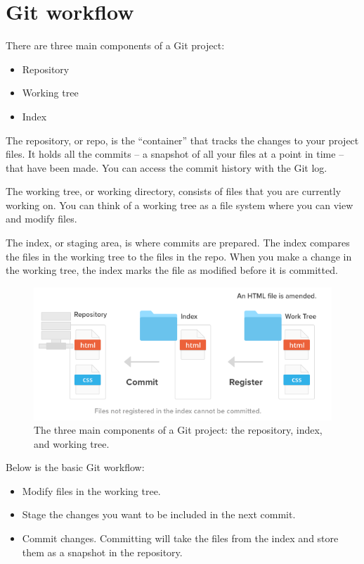 \documentclass[10pt,a4paper,english]{report}
\begin{document}
\chapter{Git workflow}
    \label{chap:workflow}

    There are three main components of a Git project:
    \begin{itemize}
        \item Repository
        \item Working tree
        \item Index
    \end{itemize}

    The repository, or repo, is the “container” that tracks the changes to your project files. It holds all the commits -- a snapshot of all your files at a point in time -- that have been made. You can access the commit history with the Git log.

    The working tree, or working directory, consists of files that you are currently working on. You can think of a working tree as a file system where you can view and modify files.

    The index, or staging area, is where commits are prepared. The index compares the files in the working tree to the files in the repo. When you make a change in the working tree, the index marks the file as modified before it is committed.

    \begin{figure}[ht]
    \begin{center}
    \includegraphics[scale=0.5]{images/git_workflow_001.png}
    \end{center}
    \caption{The three main components of a Git project: the repository, index, and working tree.}
    \end{figure}

    Below is the basic Git workflow:
    \begin{itemize}
        \item Modify files in the working tree.
        \item Stage the changes you want to be included in the next commit.
        \item Commit changes. Committing will take the files from the index and store them as a snapshot in the repository.
    \end{itemize}
\end{document}
